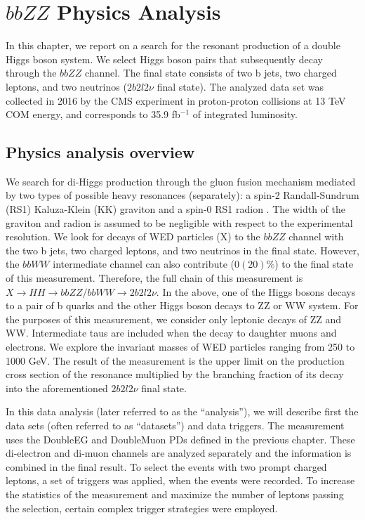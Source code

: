 \chapter{$bbZZ$ Physics Analysis}

In this chapter, we report on a search for the resonant production of a double Higgs boson system. We select Higgs boson pairs that subsequently decay through the $bbZZ$ channel. The final state consists of two b jets, two charged leptons, and two neutrinos ($2 b 2 l 2 \nu$ final state). The analyzed data set was collected in 2016 by the CMS experiment in proton-proton collisions at 13 TeV COM energy, and corresponds to 35.9 fb$^{-1}$ of integrated luminosity. 

\section{Physics analysis overview}
\label{sec:an_overview}

We search for di-Higgs production through the gluon fusion mechanism mediated by two types of possible heavy resonances (separately): a spin-2 Randall-Sundrum (RS1) Kaluza-Klein (KK) graviton and a spin-0 RS1 radion \cite{WED, Xanda}. The width of the graviton and radion is assumed to be negligible with respect to the experimental resolution. We look for decays of WED particles (X) to the $bbZZ$ channel with the two b jets, two charged leptons, and two neutrinos in the final state. However,  the $bbWW$ intermediate channel can also contribute ($0(20)\%$) to the final state of this measurement. Therefore, the full chain of this measurement is $X \rightarrow HH \rightarrow bbZZ/bbWW \rightarrow 2 b 2l 2 \nu$. In the above, one of the Higgs bosons decays to a pair of b quarks and the other Higgs boson decays to ZZ or WW system. For the purposes of this measurement, we consider only leptonic decays of ZZ and WW. Intermediate taus are included when the decay to daughter muons and electrons. We explore the invariant masses of WED particles ranging from 250 to 1000 GeV. The result of the measurement is the upper limit on the production cross section of the resonance multiplied by the branching fraction of its decay into the aforementioned $2 b 2 l 2 \nu$ final state. 

In this data analysis (later referred to as the ``analysis''), we will describe first the data sets (often referred to as ``datasets'') and data triggers. The measurement uses the DoubleEG and DoubleMuon PDs defined in the previous chapter. These di-electron and di-muon channels are analyzed separately and the information is combined in the final result. To select the events with two prompt charged leptons, a set of triggers was applied, when the events were recorded. To increase the statistics of the measurement and maximize the number of leptons passing the selection, certain complex trigger strategies were employed. 

